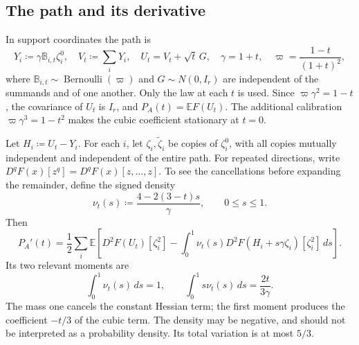 \documentclass[11pt,letterpaper]{article}
\theoremstyle{remark}
\newcommand{\E}{\mathbb E}
\newcommand{\dd}{\,d}
\begin{document}
\subsection{The path and its derivative}
\label{appx-an:sec:path}

In support coordinates the path is
\begin{equation}
 Y_i\coloneqq \gamma\mathbb B_{i,t}\zeta_i^0,\quad
 V_t\coloneqq \sum_iY_i,\quad U_t=V_t+\sqrt t\,G,
 \quad \gamma=1+t,\quad
 \varpi=\frac{1-t}{(1+t)^2},
 \label{appx-an:path}
\end{equation}
where \(\mathbb B_{i,t}\sim\operatorname{Bernoulli}(\varpi)\)
and \(G\sim N(0,I_r)\) are independent of the summands and of one
another. Only the law at each \(t\) is used. Since
\(\varpi\gamma^2=1-t\), the covariance of \(U_t\)
is \(I_r\), and \(P_A(t)=\E F(U_t)\).
The additional calibration \(\varpi\gamma^3=1-t^2\)
makes the cubic coefficient stationary at \(t=0\).

Let \(H_i\coloneqq U_t-Y_i\). For each \(i\), let
\(\zeta_i,\widetilde\zeta_i\) be copies of \(\zeta_i^0\), with all
copies mutually independent and independent of the entire path.
For repeated directions, write
\(D^qF(x)[z^q]=D^qF(x)[z,\ldots,z]\).
To see the cancellations before expanding the remainder, define the
signed density
\[
 \nu_t(s)\coloneqq \frac{4-2(3-t)s}{\gamma},\qquad 0\le s\le1.
\]
Then
\begin{equation}
 P_A'(t)=\frac12\sum_i\E\left[
 D^2F(U_t)[\zeta_i^2]
 -\int_0^1\nu_t(s)
       D^2F(H_i+s\gamma\zeta_i)[\zeta_i^2]\dd s\right].
 \label{appx-an:signed-hessian}
\end{equation}
Its two relevant moments are
\begin{equation}
 \int_0^1\nu_t(s)\dd s=1,\qquad
 \int_0^1s\nu_t(s)\dd s=\frac{2t}{3\gamma}.
 \label{appx-an:signed-moments}
\end{equation}
The mass one cancels the constant Hessian term; the first moment
produces the coefficient \(-t/3\) of the cubic term.
The density may be negative, and should not be interpreted as a
probability density. Its total variation is at most \(5/3\).
\end{document}
